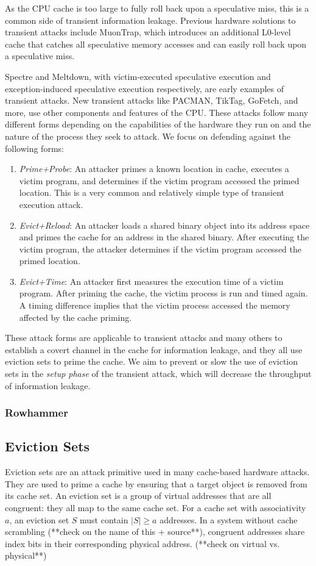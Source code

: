 \documentclass[letterpaper, twocolumn]{article}
\begin{document}
As the CPU cache is too large to fully roll back upon a speculative miss, this is a common side of transient information leakage.
Previous hardware solutions to transient attacks include MuonTrap,
which introduces an additional L0-level cache that catches all speculative memory accesses
and can easily roll back upon a speculative miss.

Spectre and Meltdown, with victim-executed speculative execution and exception-induced speculative execution respectively, 
are early examples of transient attacks.
New transient attacks like PACMAN, TikTag, GoFetch, and more, use other components and features of the CPU.
These attacks follow many different forms depending on the capabilities of the hardware they run on and the
nature of the process they seek to attack.
We focus on defending against the following forms:
\begin{enumerate}
    \item \textit{Prime+Probe}:
An attacker primes a known location in cache, executes a victim program, and determines 
if the victim program accessed the primed location. This is a very common and relatively simple
type of transient execution attack.
    \item \textit{Evict+Reload}:
An attacker loads a shared binary object into its address space and primes the cache for an address
in the shared binary.
After executing the victim program, the attacker determines if the victim program accessed the primed location.
    \item \textit{Evict+Time}:
An attacker first measures the execution time of a victim program.
After priming the cache, the victim process is run and timed again.
A timing difference implies that the victim process accessed the memory affected by the cache priming.
\end{enumerate}

These attack forms are applicable to transient attacks and many others to establish a covert channel in the cache for information leakage,
and they all use eviction sets to prime the cache.
We aim to prevent or slow the use of eviction sets in the \textit{setup phase} of the transient attack, which will decrease the throughput of information leakage.

\subsubsection{Rowhammer}

\subsection{Eviction Sets}
Eviction sets are an attack primitive used in many cache-based hardware attacks.
They are used to prime a cache by ensuring that a target object is removed from its cache set.
An eviction set is a group of virtual addresses that are all congruent: they all map to the same cache set.
For a cache set with associativity $a$, an eviction set $S$ must contain $|S| \geq a$ addresses.
In a system without cache scrambling (**check on the name of this + source**), congruent addresses share index bits in their
corresponding physical address. (**check on virtual vs. physical**)
\end{document}
